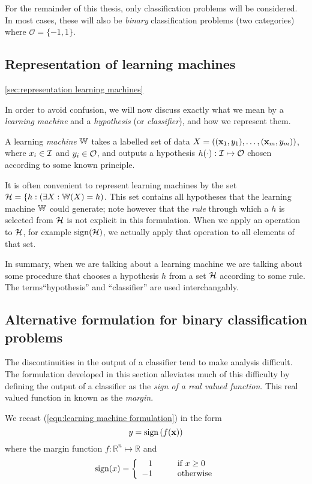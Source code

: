 For the remainder of this thesis, only classification problems will be
considered.  In most cases, these will also be \emph{binary}
classification problems (two categories) where $\mathcal{O} = \{-1,
1\}$.


\subsection{Representation of learning machines}
\ref{sec:representation learning machines}

In order to avoid confusion, we will now discuss exactly what we mean
by a \emph{learning machine} and a \emph{hypothesis} (or
\emph{classifier}), and how we represent them.

A learning \emph{machine} $\mathbb{W}$ takes a labelled set of data $X =
((\mathbf{x}_1, y_1), \ldots, (\mathbf{x}_m, y_m))$, where $x_i \in \mathcal{I}$ and
$y_i \in \mathcal{O}$, and outputs a hypothesis $h(\cdot) : \mathcal{I} \mapsto
\mathcal{O}$ chosen according to some known principle.

It is often convenient to represent learning machines by the set
$\mathcal{H} = \{h : \left( \exists X : \mathbb{W}(X) = h \right)$.  This set
contains all hypotheses that the learning machine $\mathbb{W}$ could
generate; note however that the \emph{rule} through which a $h$ is
selected from $\mathcal{H}$ is not explicit in this formulation. 
When we apply an operation to $\mathcal{H}$, for example $\mathrm{sign}(\mathcal{H})$, we
actually apply that operation to all elements of that set.

In summary, when we are talking about a learning machine we are
talking about some procedure that chooses a hypothesis $h$ from a set
$\mathcal{H}$ according to some rule.  The terms``hypothesis'' and
``classifier'' are used interchangably.


\subsection{Alternative formulation for binary classification problems}
\label{sec:margin formulation}
The discontinuities in the output of a classifier tend to make
analysis difficult.  The formulation developed in this section
alleviates much of this difficulty by defining the output of a
classifier as the  \emph{sign of a real valued function}.  This real
valued function in known as the \emph{margin}.

We recast (\ref{eqn:learning machine formulation}) in the form
%
\begin{equation}
y = \mathrm{sign} \left( f(\mathbf{x}) \right)
\label{eqn:marginal classification formulation}
\end{equation}
%
where the margin function $f : \mathbb{R}^n \mapsto \mathbb{R}$ and
%
\begin{equation}
\mathrm{sign} (x) = \left\{ \begin{array}{rl}
1	& \qquad \mbox{if $x \geq 0$} \\
-1	& \qquad \mbox{otherwise}
\end{array} \right.
\end{equation}
%

